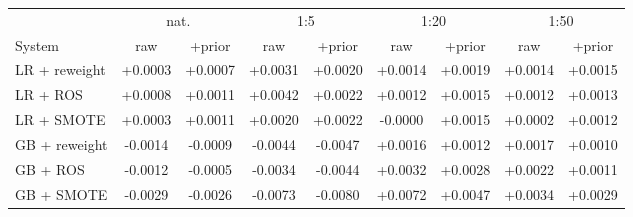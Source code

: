 \begin{tabular}{lcccccccc}
\toprule
 & \multicolumn{2}{c}{nat.} & \multicolumn{2}{c}{1:5} & \multicolumn{2}{c}{1:20} & \multicolumn{2}{c}{1:50} \\
System & raw & +prior & raw & +prior & raw & +prior & raw & +prior \\
\midrule
LR + reweight & +0.0003 & +0.0007 & +0.0031 & +0.0020 & +0.0014 & +0.0019 & +0.0014 & +0.0015 \\
LR + ROS & +0.0008 & +0.0011 & +0.0042 & +0.0022 & +0.0012 & +0.0015 & +0.0012 & +0.0013 \\
LR + SMOTE & +0.0003 & +0.0011 & +0.0020 & +0.0022 & -0.0000 & +0.0015 & +0.0002 & +0.0012 \\
GB + reweight & -0.0014 & -0.0009 & -0.0044 & -0.0047 & +0.0016 & +0.0012 & +0.0017 & +0.0010 \\
GB + ROS & -0.0012 & -0.0005 & -0.0034 & -0.0044 & +0.0032 & +0.0028 & +0.0022 & +0.0011 \\
GB + SMOTE & -0.0029 & -0.0026 & -0.0073 & -0.0080 & +0.0072 & +0.0047 & +0.0034 & +0.0029 \\
\bottomrule
\end{tabular}